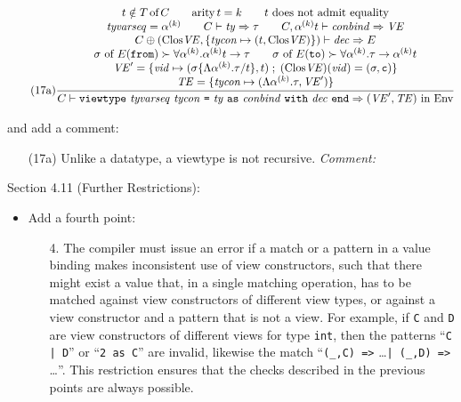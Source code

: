 \documentclass[twoside,titlepage]{article}
\begin{document}
\begin{appendix}
\begin{itemize}
  \begin{equation}
  \tag{17a}
  \frac{
  \begin{array}{@{}c@{}}
  t \notin T\,\mbox{of}\,C
  \qquad
  \mbox{arity}\,t = k
  \qquad
  \mbox{$t$ does not admit equality}
  \\
  \mathit{tyvarseq} = \alpha^{(k)}
  \qquad
  C \vdash \mathit{ty} \Rightarrow \tau
  \qquad
  C,\alpha^{(k)}t \vdash \mathit{conbind} \Rightarrow \mathit{VE}
  \\
  C \oplus (\mbox{Clos}\mathit{VE},\{\mathit{tycon}\mapsto(t,\mbox{Clos}\mathit{VE})\}) \vdash \mathit{dec} \Rightarrow E
  \\
  \sigma~\mbox{of}~E({\tt{from}}) \succ \forall\alpha^{(k)}.\alpha^{(k)}t\to\tau
  \qquad
  \sigma~\mbox{of}~E({\tt{to}}) \succ \forall\alpha^{(k)}.\tau\to\alpha^{(k)}t
  \\
  \mathit{VE}' = \{\mathit{vid}\mapsto(\sigma\{\Lambda\alpha^{(k)}.\tau/t\}, t)\;;\;(\mbox{Clos}\mathit{VE})(\mathit{vid}) = (\sigma,{\tt c})\}
  \\
  \mathit{TE} = \{\mathit{tycon}\mapsto(\Lambda\alpha^{(k)}.\tau,\mathit{VE}')\}
  \end{array}
  }{
  \begin{array}{@{}l@{}}
  C \vdash {\tt viewtype}~\mathit{tyvarseq}~\mathit{tycon}~\mbox{\tt=}~\mathit{ty}~{\tt as}~\mathit{conbind}~{\tt with}~\mathit{dec}~{\tt end} \Rightarrow \mbox{$(\mathit{VE}',\mathit{TE})$ in Env}
  \end{array}
  }
  \end{equation}

  and add a comment:
  \begin{itemize}
  \item[(17a)] Unlike a datatype, a viewtype is not recursive.
  \emph{Comment:}
  \end{itemize}
\end{itemize}

Section 4.11 (Further Restrictions):
\begin{itemize}
\item Add a fourth point:
  \begin{enumerate}
  \item[4.] The compiler must issue an error if a match or a pattern in a value binding makes inconsistent use of view constructors, such that there might exist a value that, in a single matching operation, has to be matched against view constructors of different view types, or against a view constructor and a pattern that is not a view. For example, if {\tt C} and {\tt D} are view constructors of different views for type {\tt int}, then the patterns ``{\tt{C | D}}'' or ``{\tt{2 as C}}'' are invalid, likewise the match ``{\tt(\_,C) =>} \dots {\tt| (\_,D) =>} \dots''. This restriction ensures that the checks described in the previous points are always possible.
  \end{enumerate}
\end{itemize}


\end{appendix}
\end{document}
